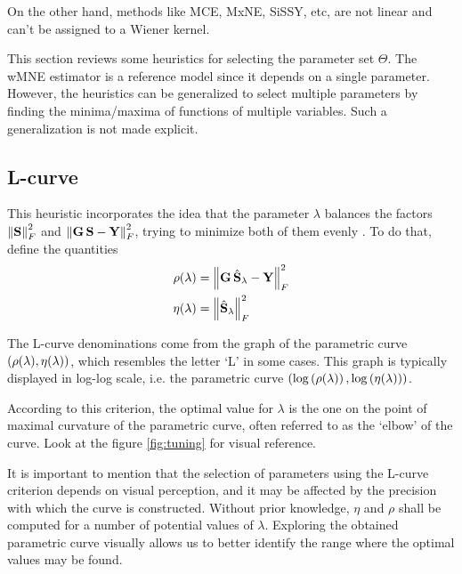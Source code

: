 On the other hand, methods like MCE, MxNE, SiSSY, etc, are not linear and can't be assigned to a Wiener kernel.

This section reviews some heuristics for selecting the parameter set $\Theta$.
%
The wMNE estimator is a reference model since it depends on a single parameter.
%
However, the heuristics can be generalized to select multiple parameters by finding the minima/maxima of functions of multiple variables.
%
Such a generalization is not made explicit.

\subsection{L-curve}

This heuristic incorporates the idea that the parameter $\lambda$ balances the factors $\left\lVert \mathbf{S} \right\rVert_F^2$ and $\left\lVert \mathbf{G}\, \mathbf{S} - \mathbf{Y} \right\rVert_F^2$, trying to minimize both of them evenly \cite{Lcurve}.
%
To do that, define the quantities
\begin{align}
\rho(\lambda)
&=
\left\lVert \mathbf{G}\, \hat{\mathbf{S}}_\lambda - \mathbf{Y} \right\rVert_F^2
\\
\eta(\lambda)
&=
\left\lVert \hat{\mathbf{S}}_\lambda \right\rVert_F^2 
\label{det:Lcurve}
\end{align}

The L-curve denominations come from the graph of the parametric curve $\left( \rho(\lambda), \eta(\lambda)  \right)$, which resembles the letter `L' in some cases.
%
This graph is typically displayed in log-log scale, i.e. the parametric curve $\left( \log\left( \rho(\lambda) \right), \log\left( \eta(\lambda) \right)  \right)$.
%

According to this criterion, the optimal value for $\lambda$ is the one on the point of maximal curvature of the parametric curve, often referred to as the `elbow' of the curve.
%
Look at the figure \ref{fig:tuning} for visual reference.

It is important to mention that the selection of parameters using the L-curve criterion depends on visual perception, and it may be affected by the precision with which the curve is constructed.
%
Without prior knowledge, $\eta$ and $\rho$ shall be computed for a number of potential values of $\lambda$.
%
Exploring the obtained parametric curve visually allows us to better identify the range where the optimal values may be found.

